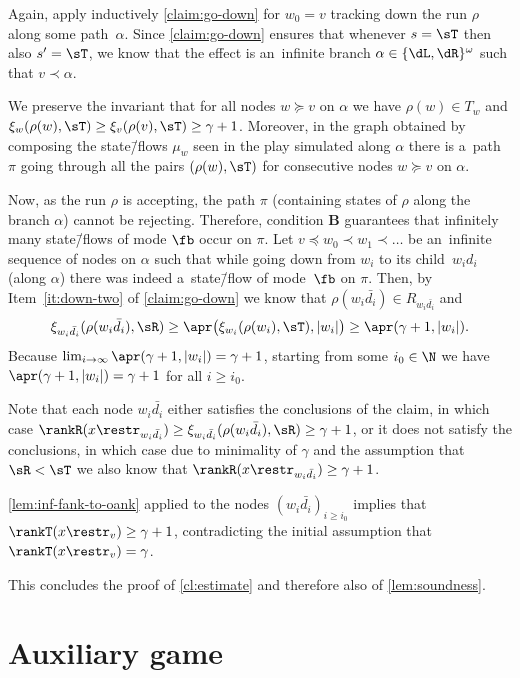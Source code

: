\documentclass{lmcs}
\numberwithin{equation}{section}
\numberwithin{figure}{section}
\newcommand{\itemfont}[1]{\textbf{#1}}
\begin{document}
	Again, apply inductively \cref{claim:go-down} for $w_0=v$ tracking down the run $\rho$ along some path~$\alpha$.
	Since \cref{claim:go-down} ensures that whenever $s=\sT$ then also $s'=\sT$, we know that the effect is an~infinite branch $\alpha\in\{\dL,\dR\}^\omega$ such that $v\prec \alpha$.

	We preserve the invariant that for all nodes $w\succeq v$ on $\alpha$ we have $\rho(w)\in T_w$ and $\xi_w(\rho(w),\sT)\geq\xi_v(\rho(v),\sT)\geq\gamma+1$.
	Moreover, in the graph obtained by composing the state\=/flows $\mu_w$ seen in the play simulated along $\alpha$
	there is a~path $\pi$ going through all the pairs $(\rho(w),\sT)$ for consecutive nodes $w\succeq v$ on $\alpha$.

	Now, as the run $\rho$ is accepting, the path $\pi$ (containing states of $\rho$ along the branch $\alpha$) cannot be rejecting.
	Therefore, condition \itemfont{B} guarantees that infinitely many state\=/flows of mode $\fb$ occur on $\pi$.
	Let $v\preceq w_0\prec w_1 \prec \ldots$ be an~infinite sequence of nodes on $\alpha$ such that while going down from $w_i$ to its child~$w_id_i$ (along $\alpha$) there was indeed a~state\=/flow of mode~$\fb$ on $\pi$.
	Then, by Item~\ref{it:down-two} of \cref{claim:go-down} we know that $\rho(w_i\bar{d_i})\in R_{w_i\bar{d_i}}$ and
	\begin{align*}
		\xi_{w_i\bar{d_i}}(\rho(w_i\bar{d_i}),\sR)\geq\apr\big(\xi_{w_i}(\rho(w_i),\sT),|w_i|\big)\geq\apr(\gamma+1,|w_i|).
	\end{align*}
	Because $\lim_{i\to\infty}\apr(\gamma+1,|w_i|)=\gamma+1$, starting from some $i_0\in\N$ we have $\apr(\gamma+1,|w_i|)=\gamma+1$ for all $i\geq i_0$.
	
	Note that each node $w_i\bar{d_i}$ either satisfies the conclusions of the claim, in which case $\rankR(x\restr_{w_i\bar{d_i}})\geq \xi_{w_i\bar{d_i}}(\rho(w_i\bar{d_i}),\sR)\geq\gamma+1$,
	or it does not satisfy the conclusions, in which case due to minimality of $\gamma$ and the assumption that $\sR<\sT$ we also know that $\rankR(x\restr_{w_i\bar{d_i}})\geq \gamma+1$.

	\cref{lem:inf-fank-to-oank} applied to the nodes $(w_i\bar{d_i})_{i\geq i_0}$ implies that
	$\rankT(x\restr_v)\geq \gamma+1$, contradicting the initial assumption that $\rankT(x\restr_v)=\gamma$.

This concludes the proof of \cref{cl:estimate} and therefore also of \cref{lem:soundness}.



\section{Auxiliary game}
\label{sec:aux-game}
\end{document}
